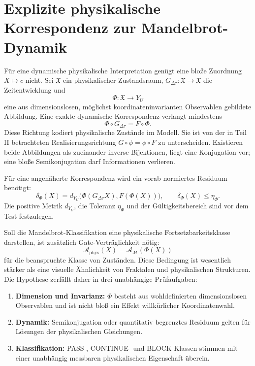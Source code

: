 \documentclass[11pt,a4paper]{article}
\theoremstyle{remark}
\newcommand{\M}{\mathcal{M}}
\begin{document}
\section{Explizite physikalische Korrespondenz zur Mandelbrot-Dynamik}
\label{sec:phys-semikonjugation}

Für eine dynamische physikalische Interpretation genügt eine bloße Zuordnung
\(X\mapsto c\) nicht. Sei \(\mathfrak X\) ein physikalischer Zustandsraum,
\(G_{\Delta\tau}:\mathfrak X\to\mathfrak X\) die Zeitentwicklung und
\[
  \Phi:\mathfrak X\longrightarrow Y_U
\]
eine aus dimensionslosen, möglichst koordinateninvarianten Observablen
gebildete Abbildung. Eine exakte dynamische Korrespondenz verlangt mindestens
\[
  \boxed{\Phi\circ G_{\Delta\tau}=F\circ\Phi.}
\]
Diese Richtung kodiert physikalische Zustände im Modell. Sie ist von der in
Teil II betrachteten Realisierungsrichtung
\(G\circ\phi=\phi\circ F\) zu unterscheiden. Existieren beide Abbildungen
als zueinander inverse Bijektionen, liegt eine Konjugation vor; eine bloße
Semikonjugation darf Informationen verlieren.

Für eine angenäherte Korrespondenz wird ein vorab normiertes Residuum
benötigt:
\[
  \delta_\Phi(X)=d_{Y_U}
  \bigl(\Phi(G_{\Delta\tau}X),F(\Phi(X))\bigr),
  \qquad \delta_\Phi(X)\le\eta_\Phi.
\]
Die positive Metrik \(d_{Y_U}\), die Toleranz \(\eta_\Phi\) und der
Gültigkeitsbereich sind vor dem Test festzulegen.

Soll die Mandelbrot-Klassifikation eine physikalische
Fortsetzbarkeitsklasse darstellen, ist zusätzlich Gate-Verträglichkeit nötig:
\[
  \mathcal A_{\mathrm{phys}}(X)
  =\mathcal A_{\M}(\Phi(X))
\]
für die beanspruchte Klasse von Zuständen. Diese Bedingung ist wesentlich
stärker als eine visuelle Ähnlichkeit von Fraktalen und physikalischen
Strukturen. Die Hypothese zerfällt daher in drei unabhängige Prüfaufgaben:

\begin{enumerate}
  \item \textbf{Dimension und Invarianz:} \(\Phi\) besteht aus
  wohldefinierten dimensionslosen Observablen und ist nicht bloß ein Effekt
  willkürlicher Koordinatenwahl.
  \item \textbf{Dynamik:} Semikonjugation oder quantitativ begrenztes
  Residuum gelten für Lösungen der physikalischen Gleichungen.
  \item \textbf{Klassifikation:} PASS-, CONTINUE- und BLOCK-Klassen stimmen
  mit einer unabhängig messbaren physikalischen Eigenschaft überein.
\end{enumerate}
\end{document}
